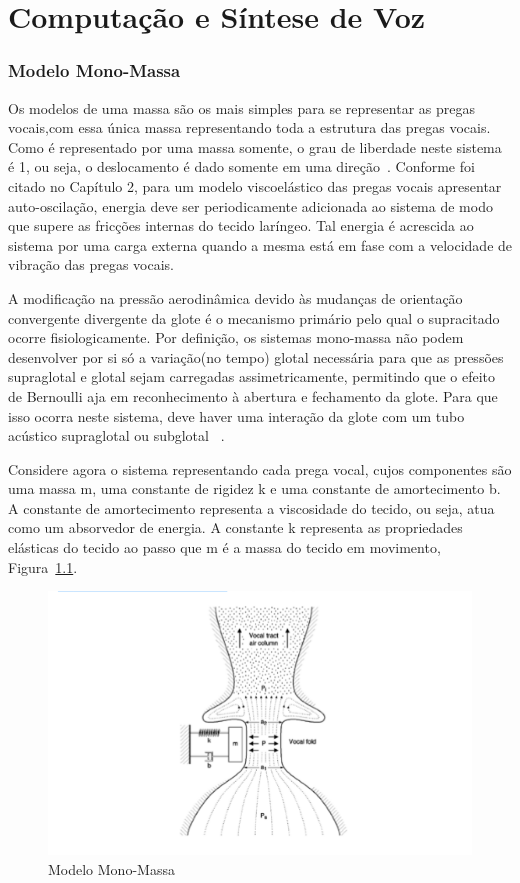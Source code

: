 \chapter{Computação e Síntese de Voz}
	
	\subsection{Modelo Mono-Massa}
	
	Os modelos de uma massa são os mais simples para se representar as pregas vocais,com essa única massa representando toda a estrutura das pregas vocais. Como é representado por uma massa somente, o grau de liberdade neste sistema é 1, ou seja, o deslocamento é dado somente em uma direção~\cite{SpeechComunication}. Conforme foi citado no Capítulo 2, para um modelo viscoelástico das pregas vocais apresentar auto-oscilação, energia deve ser periodicamente adicionada ao sistema de modo que supere as fricções internas do tecido laríngeo. Tal energia é acrescida ao sistema por uma carga externa quando a mesma está em fase com a velocidade de vibração das pregas vocais.
	
	A modiﬁcação na pressão aerodinâmica devido às mudanças de orientação convergente divergente da glote é o mecanismo primário pelo qual o supracitado ocorre ﬁsiologicamente. Por deﬁnição, os sistemas mono-massa não podem desenvolver por si só a variação(no tempo) glotal necessária para que as pressões supraglotal e glotal sejam carregadas assimetricamente, permitindo que o efeito de Bernoulli aja em reconhecimento à abertura e fechamento da glote. Para que isso ocorra neste sistema, deve haver uma interação da glote com um tubo acústico supraglotal ou subglotal ~\citealp{IngoTitze}.
	
	Considere agora o sistema representando cada prega vocal, cujos componentes são uma massa m, uma constante de rigidez k e uma constante de amortecimento b. A constante de amortecimento representa a viscosidade do tecido, ou seja, atua como um absorvedor de energia. A constante k representa as propriedades elásticas do tecido ao passo que m é a massa do tecido em movimento, Figura~\ref{fig:monoMassa}.
	
	
	\begin{figure}
		\includegraphics{monoMassa}
		\caption{Modelo Mono-Massa~\cite{IngoTitze}}
		\label{fig:monoMassa}
	\end{figure}
	

